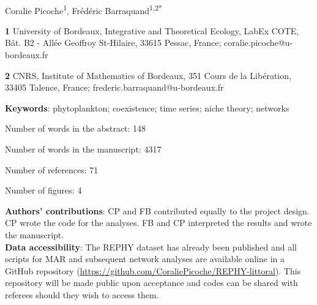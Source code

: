 \documentclass[10pt]{article}
\begin{document}
\vspace*{0.2in}


{\Large
\textbf{} %
}
\newline
\bigskip
{\large
\textbf{} %
}
\newline
\\
\bigskip
Coralie Picoche\textsuperscript{1},
Frédéric Barraquand\textsuperscript{1,2*}
\\
\bigskip

\textbf{1} University of Bordeaux, Integrative and Theoretical Ecology, LabEx COTE, Bât. B2 - Allée Geoffroy St-Hilaire, 33615 Pessac, France; coralie.picoche@u-bordeaux.fr


\textbf{2} CNRS, Institute of Mathematics of Bordeaux, 351 Cours de la Libération, 33405 Talence, France; frederic.barraquand@u-bordeaux.fr
\\

\bigskip

\textbf{Keywords}: phytoplankton; coexistence; time series; niche theory; networks 

\bigskip
Number of words in the abstract: 148

Number of words in the manuscript: 4317

Number of references: 71

Number of figures: 4
\bigskip

\textbf{Authors' contributions}: CP and FB contributed equally to the project design. CP wrote the code for the analyses. FB and CP interpreted the results and wrote the manuscript.\\

\textbf{Data accessibility}: The REPHY dataset has already been published \citep{REPHY_db} and all scripts for MAR and subsequent network analyses are available online in a GitHub repository (\url{https://github.com/CoraliePicoche/REPHY-littoral}). This repository will be made public upon acceptance and codes can be shared with referees should they wish to access them.
\end{document}
